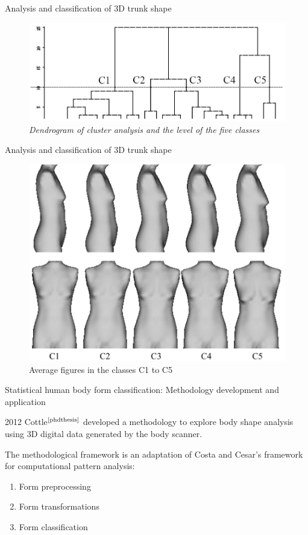 \documentclass[10pt]{beamer}
\newcommand{\bib}[1]{$^\text{\cite{#1}}$}
\begin{document}
\begin{frame}{Analysis and classification of 3D trunk shape}
	\begin{figure}[H]
		\centering
		\caption{\small\centering\itshape Dendrogram of cluster analysis and the level of the five classes}
		\includegraphics[width=0.9\linewidth]{../Images/Kuro2.jpg}
	\end{figure}
\end{frame}

\begin{frame}{Analysis and classification of 3D trunk shape}
	\begin{figure}[H]
		\caption{Average figures in the classes C1 to C5}
		\centering
		\includegraphics[width=0.6\linewidth]{../Images/Kuro3.jpg}
	\end{figure}
\end{frame}

\begin{frame}{Statistical human body form classification: Methodology development and application}
	\begin{block}{2012}
		Cottle\bib{phdthesis} developed a methodology to explore body shape analysis using 3D digital data generated by the body scanner.

		The methodological framework is an adaptation of Costa and Cesar's framework for computational pattern analysis:
		\begin{enumerate}
			\item Form preprocessing
			\item Form transformations
			\item Form classification
		\end{enumerate}
	\end{block}
\end{frame}
\end{document}
